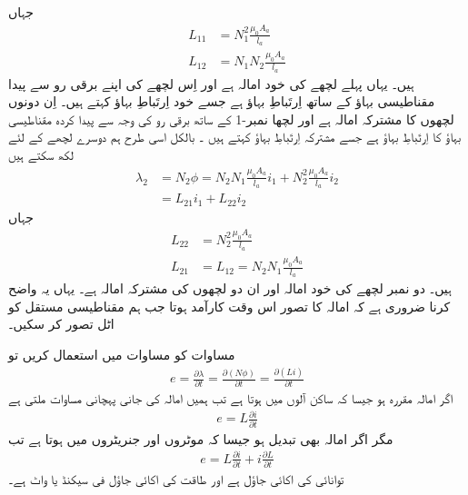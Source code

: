 جہاں
\begin{align}
L_{11}&=N_1^2  \frac{\mu_0 A_a}{l_a}\\
L_{12}&=N_1 N_2  \frac{\mu_0 A_a}{l_a}
\end{align}
ہیں۔ یہاں  پہلے لچھے کی  خود امالہ  ہے اور   اِس لچھے کی اپنے برقی رو  سے پیدا مقناطیسی بہاؤ  کے ساتھ  اِرتَباطِ بہاؤ ہے جسے خود اِرتَباطِ بہاؤ کہتے ہیں۔  اِن دونوں لچھوں  کا  مشترکہ امالہ ہے اور    لچھا نمبر-1  کے ساتھ برقی رو   کی وجہ سے پیدا کردہ مقناطیسی بہاؤ  کا اِرتَباطِ بہاؤ  ہے جسے مشترکہ اِرتَباطِ بہاؤ  کہتے ہیں ۔ بالکل اسی طرح ہم دوسرے لچھے کے لئے لکھ سکتے ہیں
\begin{align}
\lambda_2&=N_2 \phi=N_2 N_1 \frac{\mu_0 A_a}{l_a} i_1+N_2^2 \frac{\mu_0 A_a}{l_a} i_2  \nonumber \\
&=L_{21} i_1+L_{22} i_2 \label{مساوات_مقناطیسی_دور_دوسرے_لچھے_کی_ارتباط}
\end{align}
جہاں
\begin{align}
L_{22}&=N_2^2 \frac{\mu_0 A_a}{l_a}\\
L_{21}&=L_{12}=N_2 N_1 \frac{\mu_0 A_a}{l_a} \label{مساوات_مقناطیسی_دور_مشترکہ_امالہ_یکساں}
\end{align}
ہیں۔ دو نمبر لچھے  کی خود امالہ اور   ان  دو لچھوں کی مشترکہ امالہ ہے۔ یہاں یہ واضح کرنا ضروری ہے کہ امالہ کا تصور اس وقت کارآمد ہوتا جب ہم مقناطیسی مستقل   کو اٹل تصور کر سکیں۔

مساوات   کو مساوات   میں استعمال کریں تو 
\begin{align}
e=\frac{\partial \lambda}{\partial t}=\frac{ \partial \left (N \phi \right)}{\partial t}=\frac{\partial \left( L i\right) }{\partial t}
\end{align}
اگر امالہ مقررہ ہو جیسا کہ ساکن آلوں میں ہوتا ہے تب ہمیں  امالہ کی جانی پہچانی مساوات ملتی ہے 
\begin{align}
e=L \frac{\partial i}{\partial t}
\end{align}
مگر اگر امالہ بھی تبدیل ہو جیسا کہ موٹروں اور جنریٹروں میں ہوتا ہے تب
\begin{align}
e= L \frac{\partial i}{\partial t} + i \frac{\partial L}{\partial t}
\end{align}
توانائی  کی اکائی جاؤل  ہے اور طاقت  کی اکائی جاؤل فی سیکنڈ یا واٹ   ہے۔

